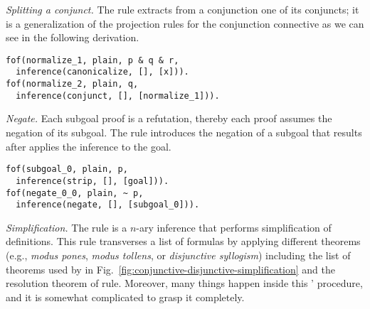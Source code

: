 \documentclass[../main.tex]{subfiles}
\begin{document}

\textit{Splitting a conjunct.}
The \conjunct rule extracts from a conjunction one of its conjuncts; it is
a generalization of the projection rules for the conjunction connective as
we can see in the following \TSTP derivation.

\begin{verbatim}
fof(normalize_1, plain, p & q & r,
  inference(canonicalize, [], [x])).
fof(normalize_2, plain, q,
  inference(conjunct, [], [normalize_1])).
\end{verbatim}

\textit{Negate.}
Each subgoal proof is a refutation, thereby each proof assumes
the negation of its subgoal. The \negate rule
introduces the negation of a subgoal that results
after applies the \strip inference to the goal.

\begin{verbatim}
fof(subgoal_0, plain, p,
  inference(strip, [], [goal])).
fof(negate_0_0, plain, ~ p,
  inference(negate, [], [subgoal_0])).
\end{verbatim}


\textit{Simplification.} %
The \simplify rule is a $n$-ary inference that performs simplification
of definitions. This rule transverses a list of formulas by
applying different theorems (e.g., \emph{modus pones}, \emph{modus tollens},
or \emph{disjunctive syllogism}) including the list of theorems used by
\canonicalize in Fig.~\ref{fig:conjunctive-disjunctive-simplification}
and the resolution theorem of \resolve rule.
Moreover, many things happen inside this \Metis' procedure, and
it is somewhat complicated to grasp it completely.
\end{document}
